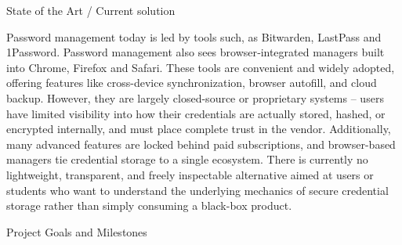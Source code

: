 \documentclass[11pt,a4paper]{article}
\newcommand{\blueheading}[1]{%
    {\sffamily\color{TitleBlue}\fontsize{15}{18}\selectfont #1}%
}
\newcommand{\answerbox}[2][]{%
    \vspace{2pt}
    \begin{framed}
    #2
    \end{framed}
}
\begin{document}
\vspace{12mm}

\blueheading{State of the Art / Current solution }

\vspace{1mm}


\answerbox{Password management today is led by tools such, as Bitwarden, LastPass and 1Password. Password management also sees browser‑integrated managers built into Chrome, Firefox and Safari. These tools are convenient and widely adopted, offering features like cross-device synchronization, browser autofill, and cloud backup. However, they are largely closed-source or proprietary systems -- users have limited visibility into how their credentials are actually stored, hashed, or encrypted internally, and must place complete trust in the vendor. Additionally, many advanced features are locked behind paid subscriptions, and browser-based managers tie credential storage to a single ecosystem. There is currently no lightweight, transparent, and freely inspectable alternative aimed at users or students who want to understand the underlying mechanics of secure credential storage rather than simply consuming a black-box product.}

\vspace{12mm}

\blueheading{Project Goals and Milestones}

\vspace{1mm}
\end{document}
